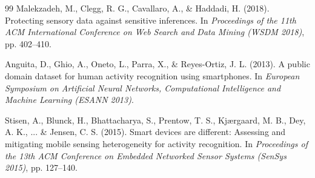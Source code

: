 \begin{thebibliography}{99}
Malekzadeh, M., Clegg, R. G., Cavallaro, A., \& Haddadi, H. (2018). 
Protecting sensory data against sensitive inferences. 
In \textit{Proceedings of the 11th ACM International Conference on Web Search and Data Mining (WSDM 2018)}, pp. 402--410.

Anguita, D., Ghio, A., Oneto, L., Parra, X., \& Reyes-Ortiz, J. L. (2013). 
A public domain dataset for human activity recognition using smartphones. 
In \textit{European Symposium on Artificial Neural Networks, Computational Intelligence and Machine Learning (ESANN 2013)}.

Stisen, A., Blunck, H., Bhattacharya, S., Prentow, T. S., Kjærgaard, M. B., Dey, A. K., ... \& Jensen, C. S. (2015). 
Smart devices are different: Assessing and mitigating mobile sensing heterogeneity for activity recognition. 
In \textit{Proceedings of the 13th ACM Conference on Embedded Networked Sensor Systems (SenSys 2015)}, pp. 127--140.

\end{thebibliography}
